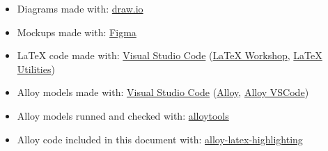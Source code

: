 \begin{itemize}
    \item Diagrams made with: \href{http://www.draw.io}{draw.io}
    \item Mockups made with: \href{https://www.figma.com/}{Figma}
    \item LaTeX code made with: \href{https://code.visualstudio.com/}{Visual Studio Code} (\href{https://marketplace.visualstudio.com/items?itemName=James-Yu.latex-workshop}{LaTeX Workshop}, \href{https://marketplace.visualstudio.com/items?itemName=tecosaur.latex-utilities}{LaTeX Utilities})
    \item Alloy models made with: \href{https://code.visualstudio.com/}{Visual Studio Code} (\href{https://marketplace.visualstudio.com/items?itemName=ArashSahebolamri.alloy}{Alloy}, \href{https://marketplace.visualstudio.com/items?itemName=DongyuZhao.alloy-vscode}{Alloy VSCode})
    \item Alloy models runned and checked with: \href{https://alloytools.org/}{alloytools}
    \item Alloy code included in this document with: \href{https://github.com/Angtrim/alloy-latex-highlighting}{alloy-latex-highlighting}
\end{itemize}